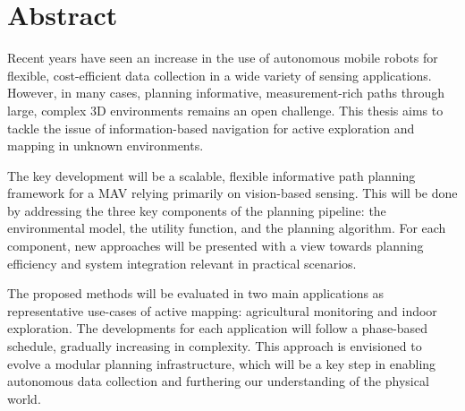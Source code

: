 \section*{Abstract}

Recent years have seen an increase in the use of autonomous mobile robots for flexible, cost-efficient data 
collection in a wide variety of sensing applications. However, in many cases, planning informative, 
measurement-rich paths through large, complex 3D environments remains an open challenge. This thesis aims to 
tackle the issue of information-based navigation for active exploration and mapping in 
unknown environments.

The key development will be a scalable, flexible informative path planning framework for a MAV relying 
primarily on vision-based sensing. This will be done by addressing the three key components of the planning 
pipeline: the environmental model, the utility function, and the planning algorithm. For each component, new 
approaches will be presented with a view towards planning efficiency and system integration relevant 
in practical scenarios.

The proposed methods will be evaluated in two main applications as representative use-cases of active 
mapping: agricultural monitoring and indoor exploration. The developments for each application will follow a 
phase-based schedule, gradually increasing in complexity. This approach is envisioned to evolve a 
modular planning infrastructure, which will be a key step in enabling autonomous data collection and 
furthering our understanding of the physical world.